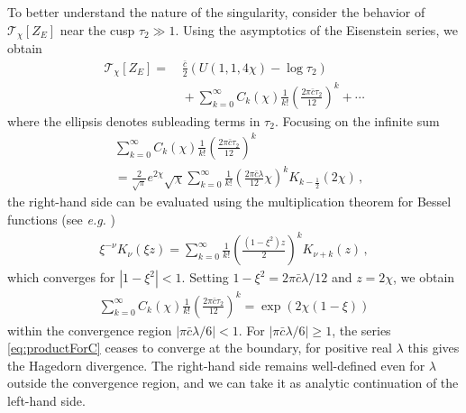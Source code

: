 \documentclass[aps,twocolumn,prl,showpacs,amsmath,amssymb,10pt]{revtex4-2}
\def\tc{\bar{c}}
\begin{document}
\vspace{0.3cm}
 To better understand the nature of the singularity, consider the behavior of $\mathcal{T}_{\chi}[Z_E]$ near the cusp $\tau_2\gg 1$. Using the asymptotics of the Eisenstein series, we obtain
\begin{align}
\mathcal{T}_{\chi}[Z_E]=&\,\frac{\bar{c}}{2}(U(1,1,4\chi)-\log\tau_2)\\\nonumber
&\,+\sum_{k=0}^{\infty}C_k(\chi)\frac{1}{k!}\left(\frac{2\pi \tc\tau_2}{12}\right)^k+\cdots
\end{align}
where the ellipsis denotes subleading terms in $\tau_2$. Focusing on the infinite sum
\begin{align}
&\sum_{k=0}^{\infty}C_k(\chi)\frac{1}{k!}\left(\frac{2\pi \tc\tau_2}{12}\right)^k\\\nonumber
&=\frac{2}{\sqrt{\pi}}e^{2\chi}\sqrt{\chi}\sum_{k=0}^{\infty}\frac{1}{k!}\left(\frac{2\pi \tc\lambda}{12}\chi\right)^kK_{k-\frac{1}{2}}(2\chi)\,,
\end{align}
the right-hand side can be evaluated using the multiplication theorem for Bessel functions (see \emph{e.g.} \cite{gradshteyn2014table})
\begin{align}
\xi^{-\nu}K_{\nu}(\xi z)=\sum_{k=0}^{\infty}\frac{1}{k!}\left(\frac{(1-\xi^2)z}{2}\right)^k K_{\nu+k}(z)\,,
\end{align}
which converges for $|1-\xi^2|<1$. Setting $1-\xi^2=2\pi \tc\lambda/12$ and $z=2\chi$, we obtain
\begin{align}
\label{eq:productForC}
\sum_{k=0}^{\infty}C_k(\chi)\frac{1}{k!}\left(\frac{2\pi \tc\tau_2}{12}\right)^k=\exp\left(2\chi(1-\xi)\right)
\end{align}
within the convergence region $|\pi \tc\lambda/6|<1$. For $|\pi \tc \lambda/6|\ge 1$, the series \eqref{eq:productForC} ceases to converge at the boundary, for positive real $\lambda$ this gives the Hagedorn divergence. The right-hand side remains well-defined even for $\lambda$ outside the convergence region, and we can take it as analytic continuation of the left-hand side.
\end{document}

